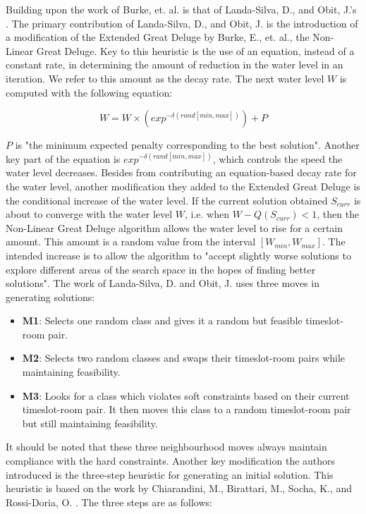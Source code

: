 Building upon the work of Burke, et. al. is that of Landa-Silva, D., and Obit, J.'s \cite{nlgd-landa-silva}. The primary contribution of Landa-Silva, D., and Obit, J. is the introduction of a modification of the Extended Great Deluge by Burke, E., et. al., the Non-Linear Great Deluge. Key to this heuristic is the use of an equation, instead of a constant rate, in determining the amount of reduction in the water level in an iteration. We refer to this amount as the decay rate. The next water level $W$ is computed with the following equation:

\[
	W = W \times (exp^{-\delta(rand[min, max])}) + P	
\]

$P$ is "the minimum expected penalty corresponding to the best solution". Another key part of the equation is $exp^{-\delta(rand[min, max])}$, which controls the speed the water level decreases. Besides from contributing an equation-based decay rate for the water level, another modification they added to the Extended Great Deluge is the conditional increase of the water level. If the current solution obtained $S_{curr}$ is about to converge with the water level $W$, i.e. when $W - Q(S_{curr}) < 1$, then the Non-Linear Great Deluge algorithm allows the water level to rise for a certain amount. This amount is a random value from the interval $[W_{min}, W_{max}]$. The intended increase is to allow the algorithm to "accept slightly worse solutions to explore different areas of the search space in the hopes of finding better solutions". The work of Landa-Silva, D. and Obit, J. uses three moves in generating solutions:

\begin{itemize}
	\item \textbf{M1}: Selects one random class and gives it a random but feasible timeslot-room pair.
	\item \textbf{M2}: Selects two random classes and swaps their timeslot-room pairs while maintaining feasibility.
	\item \textbf{M3}: Looks for a class which violates soft constraints based on their current timeslot-room pair. It then moves this class to a random timeslot-room pair but still maintaining feasibility.
\end{itemize}

It should be noted that these three neighbourhood moves always maintain compliance with the hard constraints. Another key modification the authors introduced is the three-step heuristic for generating an initial solution. This heuristic is based on the work by Chiarandini, M., Birattari, M., Socha, K., and Rossi-Doria, O. \cite{chiarandini-effective-hybrid}. The three steps are as follows:

